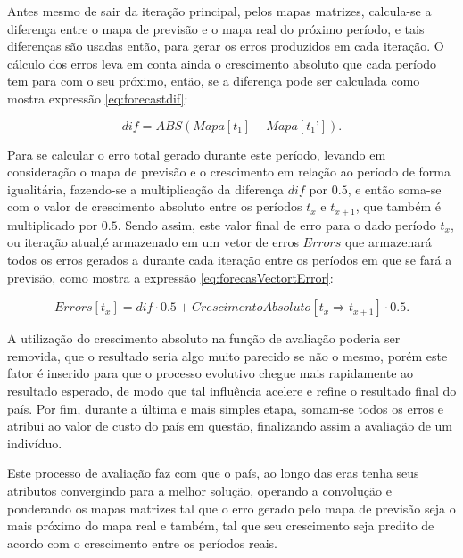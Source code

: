 Antes mesmo de sair da iteração principal, pelos mapas matrizes, calcula-se a diferença entre o mapa de previsão e o mapa real do próximo período, e tais diferenças são usadas então, para gerar os erros produzidos em cada iteração. O cálculo dos erros leva em conta ainda o crescimento absoluto que cada período tem para com o seu próximo, então, se a diferença pode ser calculada como mostra expressão \ref{eq:forecastdif}:

\begin{equation}
\label{eq:forecastdif}
dif = ABS( Mapa[t_1] - Mapa[t_1’] ).
\end{equation}
	
Para se calcular o erro total gerado durante este período, levando em consideração o mapa de previsão e o crescimento em relação ao período de forma igualitária, fazendo-se a multiplicação da diferença \(dif\) por \(0.5\), e então soma-se com o valor de crescimento absoluto entre os períodos \(t_x\) e \(t_{x+1}\), que também é multiplicado por \(0.5\). Sendo assim, este valor final de erro para o dado período \(t_x\), ou iteração atual,é armazenado em um vetor de erros \(Errors\) que armazenará todos os erros gerados a durante cada iteração entre os períodos em que se fará a previsão, como mostra a expressão \ref{eq:forecasVectortError}:

\begin{equation}
\label{eq:forecasVectortError}
	Errors[t_x] = dif \cdot 0.5 + CrescimentoAbsoluto[t_x \Rightarrow t_{x+1}] \cdot 0.5.
\end{equation}

A utilização do crescimento absoluto na função de avaliação poderia ser removida, que o resultado seria algo muito parecido se não o mesmo, porém este fator é inserido para que o processo evolutivo chegue mais rapidamente ao resultado esperado, de modo que tal influência acelere e refine o resultado final do país. Por fim, durante a última e mais simples etapa, somam-se todos os erros e atribui ao valor de custo do país em questão, finalizando assim a avaliação de um indivíduo. 

Este processo de avaliação faz com que o país, ao longo das eras tenha seus atributos convergindo para a melhor solução, operando a convolução e ponderando os mapas matrizes tal que o erro gerado pelo mapa de previsão seja o mais próximo do mapa real e também, tal que seu crescimento seja predito de acordo com o crescimento entre os períodos reais. 

